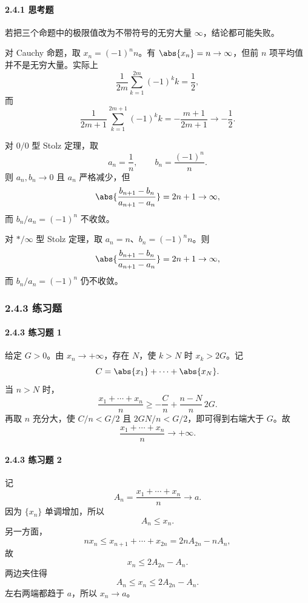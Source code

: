 \paragraph{2.4.1 思考题}
\begin{xsolution}
若把三个命题中的极限值改为不带符号的无穷大量 $\infty$，结论都可能失败。

对 Cauchy 命题，取 $x_n=(-1)^n n$。有 $\abs{x_n}=n\to\infty$，但前 $n$ 项平均值并不是无穷大量。实际上
\[
  \frac1{2m}\sum_{k=1}^{2m}(-1)^k k=\frac12,
\]
而
\[
  \frac1{2m+1}\sum_{k=1}^{2m+1}(-1)^k k
  =-\frac{m+1}{2m+1}\to-\frac12.
\]

对 $0/0$ 型 Stolz 定理，取
\[
  a_n=\frac1n,\qquad b_n=\frac{(-1)^n}{n}.
\]
则 $a_n,b_n\to0$ 且 $a_n$ 严格减少，但
\[
  \abs{\frac{b_{n+1}-b_n}{a_{n+1}-a_n}}
  =2n+1\to\infty,
\]
而 $b_n/a_n=(-1)^n$ 不收敛。

对 $*/\infty$ 型 Stolz 定理，取 $a_n=n$、$b_n=(-1)^n n$。则
\[
  \abs{\frac{b_{n+1}-b_n}{a_{n+1}-a_n}}=2n+1\to\infty,
\]
而 $b_n/a_n=(-1)^n$ 仍不收敛。
\end{xsolution}

\subsubsection*{2.4.3 练习题}

\paragraph{2.4.3 练习题 1}
\begin{xsolution}
给定 $G>0$。由 $x_n\to+\infty$，存在 $N$，使 $k>N$ 时 $x_k>2G$。记
\[
  C=\abs{x_1}+\cdots+\abs{x_N}.
\]
当 $n>N$ 时，
\[
  \frac{x_1+\cdots+x_n}{n}
  \ge-\frac Cn+\frac{n-N}{n}\,2G.
\]
再取 $n$ 充分大，使 $C/n<G/2$ 且 $2GN/n<G/2$，即可得到右端大于 $G$。故
\[
  \frac{x_1+\cdots+x_n}{n}\to+\infty.
\]
\end{xsolution}

\paragraph{2.4.3 练习题 2}
\begin{xsolution}
记
\[
  A_n=\frac{x_1+\cdots+x_n}{n}\to a.
\]
因为 $\{x_n\}$ 单调增加，所以
\[
  A_n\le x_n.
\]
另一方面，
\[
  nx_n\le x_{n+1}+\cdots+x_{2n}=2nA_{2n}-nA_n,
\]
故
\[
  x_n\le2A_{2n}-A_n.
\]
两边夹住得
\[
  A_n\le x_n\le2A_{2n}-A_n.
\]
左右两端都趋于 $a$，所以 $x_n\to a$。
\end{xsolution}

